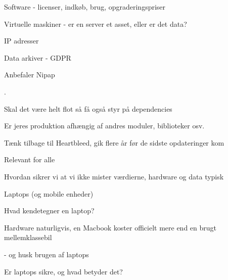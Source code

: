 \documentclass[Screen16to9,17pt]{foils}
\begin{document}


\begin{list2}
\item Software - licenser, indkøb, brug, opgraderingspriser
\item Virtuelle maskiner - er en server et asset, eller er det data?
\item IP adresser
\item Data arkiver - GDPR
\end{list2}


\begin{list2}
\item Anbefaler Nipap 
\end{list2}


.

\begin{list2}
\item Skal det være helt flot så få også styr på dependencies
\item Er jeres produktion afhængig af andres moduler, biblioteker osv.
\item Tænk tilbage til Heartbleed, gik flere år før de sidste opdateringer kom
\end{list2}





\begin{list2}
\item Relevant for alle
\item Hvordan sikrer vi at vi ikke mister værdierne, hardware og data typisk
\end{list2}




\begin{list2}
\item Laptops (og mobile enheder)
\item Hvad kendetegner en laptop?
\item Hardware naturligvis, en Macbook koster officielt mere end en brugt mellemklassebil
\item - og husk brugen af laptops
\item Er laptops sikre, og hvad betyder det?
\end{list2}
\end{document}

